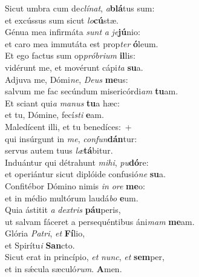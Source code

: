 \evenverse Sicut umbra cum de\textit{clí}\textit{nat}, \textit{a}\textbf{blá}tus sum:~\*\\
\evenverse et excússus sum sicut \textit{lo}\textbf{cú}stæ.\\
\oddverse Génua mea infirmáta \textit{sunt} \textit{a} \textit{je}\textbf{jú}nio:~\*\\
\oddverse et caro mea immutáta est prop\textit{ter} \textbf{ó}leum.\\
\evenverse Et ego factus sum op\textit{pró}\textit{bri}\textit{um} \textbf{il}lis:~\*\\
\evenverse vidérunt me, et movérunt cápi\textit{ta} \textbf{su}a.\\
\oddverse Adjuva me, Dómi\textit{ne}, \textit{De}\textit{us} \textbf{me}us:~\*\\
\oddverse salvum me fac secúndum misericórdi\textit{am} \textbf{tu}am.\\
\evenverse Et sciant qui\textit{a} \textit{ma}\textit{nus} \textbf{tu}a hæc:~\*\\
\evenverse et tu, Dómine, fecí\textit{sti} \textbf{e}am.\\
\oddverse Maledícent illi, et tu benedíces:~+\\
\oddverse  qui insúrgunt in \textit{me}, \textit{con}\textit{fun}\textbf{dán}tur:~\*\\
\oddverse servus autem tuus \textit{læ}\textbf{tá}bitur.\\
\evenverse Induántur qui détrahunt \textit{mi}\textit{hi}, \textit{pu}\textbf{dó}re:~\*\\
\evenverse et operiántur sicut diplóide confusió\textit{ne} \textbf{su}a.\\
\oddverse Confitébor Dómino nimis \textit{in} \textit{o}\textit{re} \textbf{me}o:~\*\\
\oddverse et in médio multórum laudá\textit{bo} \textbf{e}um.\\
\evenverse Quia ástitit \textit{a} \textit{dex}\textit{tris} \textbf{páu}peris,~\*\\
\evenverse ut salvam fáceret a persequéntibus áni\textit{mam} \textbf{me}am.\\
\oddverse Glória \textit{Pa}\textit{tri}, \textit{et} \textbf{Fí}lio,~\*\\
\oddverse et Spirítu\textit{i} \textbf{San}cto.\\
\evenverse Sicut erat in princípio, \textit{et} \textit{nunc}, \textit{et} \textbf{sem}per,~\*\\
\evenverse et in sǽcula sæculó\textit{rum}. \textbf{A}men.\\
